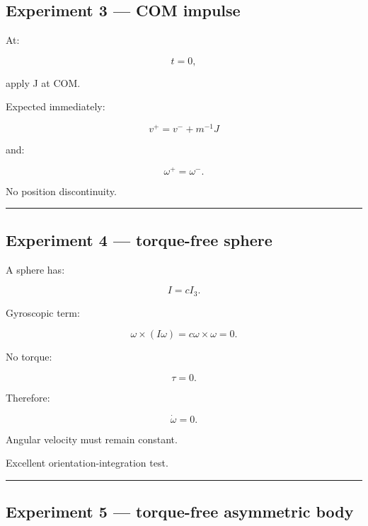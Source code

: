 \subsection{Experiment 3 --- COM impulse}\label{06-engine-ii-ch039-experiment-3-com-impulse}

\hypertarget{06-engine-ii-ch039-experiment-3-com-impulse}{}

At:

\[
t=0,
\]

apply J at COM.

Expected immediately:

\[
v^+
=
v^-+
m^{-1}J
\]

and:

\[
\omega^+=\omega^-.
\]

No position discontinuity.

\begin{center}\rule{0.5\linewidth}{0.5pt}\end{center}

\subsection{Experiment 4 --- torque-free sphere}\label{06-engine-ii-ch039-experiment-4-torque-free-sphere}

\hypertarget{06-engine-ii-ch039-experiment-4-torque-free-sphere}{}

A sphere has:

\[
I=cI_3.
\]

Gyroscopic term:

\[
\omega\times(I\omega)
=
c\omega\times\omega
=
0.
\]

No torque:

\[
\tau=0.
\]

Therefore:

\[
\dot\omega=0.
\]

Angular velocity must remain constant.

Excellent orientation-integration test.

\begin{center}\rule{0.5\linewidth}{0.5pt}\end{center}

\subsection{Experiment 5 --- torque-free asymmetric body}\label{06-engine-ii-ch039-experiment-5-torque-free-asymmetric-body}

\hypertarget{06-engine-ii-ch039-experiment-5-torque-free-asymmetric-body}{}

